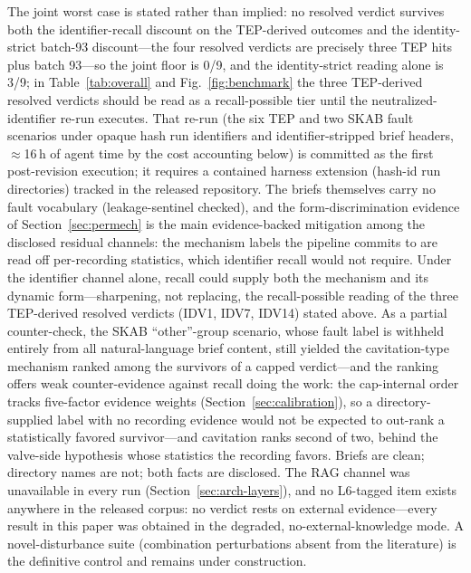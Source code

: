 \documentclass[preprint,10pt]{elsarticle}
\begin{document}
The joint worst case is stated rather than implied: no resolved verdict survives both the identifier-recall discount on the TEP-derived outcomes and the identity-strict batch-93 discount---the four resolved verdicts are precisely three TEP hits plus batch 93---so the joint floor is 0/9, and the identity-strict reading alone is 3/9; in Table~\ref{tab:overall} and Fig.~\ref{fig:benchmark} the three TEP-derived resolved verdicts should be read as a recall-possible tier until the neutralized-identifier re-run executes. That re-run (the six TEP and two SKAB fault scenarios under opaque hash run identifiers and identifier-stripped brief headers, $\approx$16\,h of agent time by the cost accounting below) is committed as the first post-revision execution; it requires a contained harness extension (hash-id run directories) tracked in the released repository. The briefs themselves carry no fault vocabulary (leakage-sentinel checked), and the form-discrimination evidence of Section~\ref{sec:permech} is the main evidence-backed mitigation among the disclosed residual channels: the mechanism labels the pipeline commits to are read off per-recording statistics, which identifier recall would not require. Under the identifier channel alone, recall could supply both the mechanism and its dynamic form---sharpening, not replacing, the recall-possible reading of the three TEP-derived resolved verdicts (IDV1, IDV7, IDV14) stated above. As a partial counter-check, the SKAB ``other''-group scenario, whose fault label is withheld entirely from all natural-language brief content, still yielded the cavitation-type mechanism ranked among the survivors of a capped verdict---and the ranking offers weak counter-evidence against recall doing the work: the cap-internal order tracks five-factor evidence weights (Section~\ref{sec:calibration}), so a directory-supplied label with no recording evidence would not be expected to out-rank a statistically favored survivor---and cavitation ranks second of two, behind the valve-side hypothesis whose statistics the recording favors. Briefs are clean; directory names are not; both facts are disclosed. The RAG channel was unavailable in every run (Section~\ref{sec:arch-layers}), and no L6-tagged item exists anywhere in the released corpus: no verdict rests on external evidence---every result in this paper was obtained in the degraded, no-external-knowledge mode. A novel-disturbance suite (combination perturbations absent from the literature) is the definitive control and remains under construction.
\end{document}
